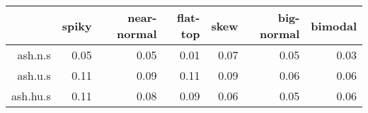 \begin{tabular}{rrrrrrr}
  \toprule  & spiky & near-normal & flat-top & skew & big-normal & bimodal \\ 
  \midrule ash.n.s & 0.05 & 0.05 & 0.01 & 0.07 & 0.05 & 0.03 \\ 
  ash.u.s & 0.11 & 0.09 & 0.11 & 0.09 & 0.06 & 0.06 \\ 
  ash.hu.s & 0.11 & 0.08 & 0.09 & 0.06 & 0.05 & 0.06 \\ 
   \bottomrule \end{tabular}

